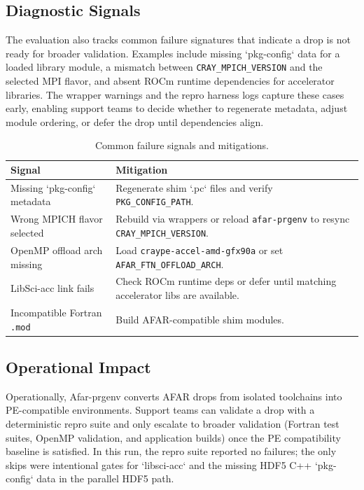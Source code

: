 \subsection{Diagnostic Signals}
\label{sec:diagnostics-results}
The evaluation also tracks common failure signatures that indicate a drop is
not ready for broader validation. Examples include missing `pkg-config` data
for a loaded library module, a mismatch between \texttt{CRAY\_MPICH\_VERSION}
and the selected MPI flavor, and absent ROCm runtime dependencies for
accelerator libraries. The wrapper warnings and the repro harness logs capture
these cases early, enabling support teams to decide whether to regenerate
metadata, adjust module ordering, or defer the drop until dependencies align.

\begin{table}[t]
  \centering
  \small
  \setlength{\tabcolsep}{4pt}
  \caption{Common failure signals and mitigations.}
  \label{tab:failure-modes}
  \begin{tabular}{p{} p{}}
    \hline
    Signal & Mitigation \\
    \hline
    Missing `pkg-config` metadata & Regenerate shim `.pc` files and
    verify \texttt{PKG\_CONFIG\_PATH}. \\
    Wrong MPICH flavor selected & Rebuild via wrappers or reload
    \texttt{afar-prgenv} to resync \texttt{CRAY\_MPICH\_VERSION}. \\
    OpenMP offload arch missing & Load
    \texttt{craype-accel-}\allowbreak\texttt{amd-gfx90a} or set
    \texttt{AFAR\_FTN\_OFFLOAD\_ARCH}. \\
    LibSci-acc link fails & Check ROCm runtime deps or defer until matching
    accelerator libs are available. \\
    Incompatible Fortran \texttt{.mod} & Build AFAR-compatible shim modules. \\
    \hline
  \end{tabular}
\end{table}

\subsection{Operational Impact}
\label{sec:impact}
Operationally, Afar-prgenv converts AFAR drops from isolated toolchains into
PE-compatible environments. Support teams can validate a drop with a
deterministic repro suite and only escalate to broader validation (Fortran test
suites, OpenMP validation, and application builds) once the PE compatibility
baseline is satisfied.
In this run, the repro suite reported no failures; the only skips were
intentional gates for `libsci-acc` and the missing HDF5 C++ `pkg-config` data
in the parallel HDF5 path.

